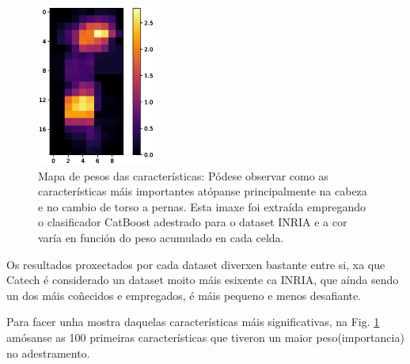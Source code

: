 \documentclass[galician]{./head/uvigo-tfg}
\begin{document}
        \begin{figure}[t]
            \centering
            \includegraphics[height=200px]{figures/color_map.eps}
            \caption{Mapa de pesos das características: Pódese observar como as características máis importantes atópanse principalmente na cabeza e no cambio de torso a pernas. Esta imaxe foi extraída empregando o clasificador CatBoost adestrado para o dataset INRIA e a cor varía en función do peso acumulado en cada celda.}
            \label{fig:colormap}
        \end{figure}
        \par Os resultados proxectados por cada dataset diverxen bastante entre si, xa que Catech é considerado un dataset moito máis esixente ca INRIA, que aínda sendo un dos máis coñecidos e empregados, é máis pequeno e menos desafiante.
        \par Para facer unha mostra daquelas características máis significativas, na Fig. \ref{fig:colormap} amósanse as 100 primeiras características que tiveron un maior peso(importancia) no adestramento.
    

\end{document}
